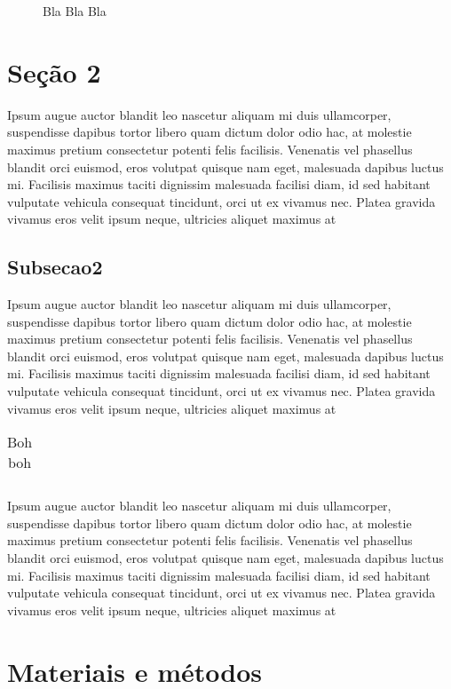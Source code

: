 \documentclass[msc, classic, a4paper, oneside]{ufbathesis}
\begin{document}
\begin{figure}
\caption{Bla Bla Bla}
\label{fig:bla}
\end{figure}

\section{Seção 2}
Ipsum augue auctor blandit leo nascetur aliquam mi duis ullamcorper, suspendisse dapibus tortor libero quam dictum dolor odio hac, at molestie maximus pretium consectetur potenti felis facilisis. Venenatis vel phasellus blandit orci euismod, eros volutpat quisque nam eget, malesuada dapibus luctus mi. Facilisis maximus taciti dignissim malesuada facilisi diam, id sed habitant vulputate vehicula consequat tincidunt, orci ut ex vivamus nec. Platea gravida vivamus eros velit ipsum neque, ultricies aliquet maximus at

\subsection{Subsecao2}
Ipsum augue auctor blandit leo nascetur aliquam mi duis ullamcorper, suspendisse dapibus tortor libero quam dictum dolor odio hac, at molestie maximus pretium consectetur potenti felis facilisis. Venenatis vel phasellus blandit orci euismod, eros volutpat quisque nam eget, malesuada dapibus luctus mi. Facilisis maximus taciti dignissim malesuada facilisi diam, id sed habitant vulputate vehicula consequat tincidunt, orci ut ex vivamus nec. Platea gravida vivamus eros velit ipsum neque, ultricies aliquet maximus at

\begin{table}[hb]
\caption{Boh boh}
\begin{tabular}{|l|l|r|}
\end{tabular}
\label{tab:boh}
\end{table}


Ipsum augue auctor blandit leo nascetur aliquam mi duis ullamcorper, suspendisse dapibus tortor libero quam dictum dolor odio hac, at molestie maximus pretium consectetur potenti felis facilisis. Venenatis vel phasellus blandit orci euismod, eros volutpat quisque nam eget, malesuada dapibus luctus mi. Facilisis maximus taciti dignissim malesuada facilisi diam, id sed habitant vulputate vehicula consequat tincidunt, orci ut ex vivamus nec. Platea gravida vivamus eros velit ipsum neque, ultricies aliquet maximus at

\section{Materiais e métodos}
\end{document}
